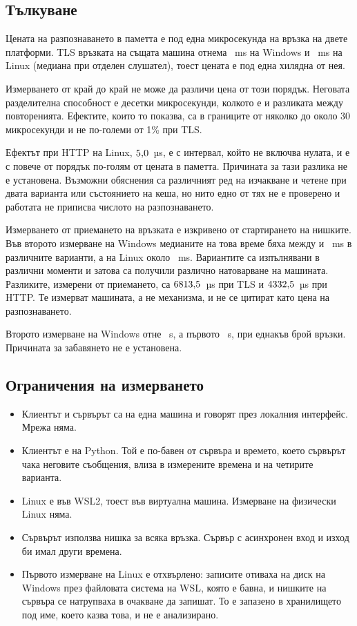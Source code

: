 \subsection{Тълкуване}

Цената на разпознаването в паметта е под една микросекунда на връзка на двете
платформи. TLS връзката на същата машина отнема \winTlsDedicatedMedian{}~ms на Windows и
\linTlsDedicatedMedian{}~ms на Linux (медиана при отделен слушател), тоест цената е под
една хилядна от нея.

Измерването от край до край не може да различи цена от този порядък. Неговата
разделителна способност е десетки микросекунди, колкото е и разликата между
повторенията. Ефектите, които то показва, са в границите от няколко до около 30
микросекунди и не по-големи от 1\% при TLS.

Ефектът при HTTP на Linux, $5{,}0$~µs, е с интервал, който не включва нулата,
и е с повече от порядък по-голям от цената в паметта. Причината за тази разлика не е
установена. Възможни обяснения са различният ред на изчакване и четене при двата
варианта или състоянието на кеша, но нито едно от тях не е проверено и работата не
приписва числото на разпознаването.

Измерването от приемането на връзката е изкривено от стартирането на нишките. Във
второто измерване на Windows медианите на това време бяха между
\winClearDedicatedStartMedian{} и \winTlsDetectStartMedian{}~ms в различните варианти, а
на Linux около \linClearDedicatedStartMedian{}~ms. Вариантите са изпълнявани в различни
моменти и затова са получили различно натоварване на машината. Разликите, измерени от
приемането, са $6813{,}5$~µs при TLS и $4332{,}5$~µs при HTTP. Те измерват
машината, а не механизма, и не се цитират като цена на разпознаването.

Второто измерване на Windows отне \winDuration{}~s, а първото \winfirstDuration{}~s, при
еднакъв брой връзки. Причината за забавянето не е установена.

\subsection{Ограничения на измерването}

\begin{itemize}
\item Клиентът и сървърът са на една машина и говорят през локалния интерфейс. Мрежа
  няма.
\item Клиентът е на Python. Той е по-бавен от сървъра и времето, което сървърът чака
  неговите съобщения, влиза в измерените времена и на четирите варианта.
\item Linux е във WSL2, тоест във виртуална машина. Измерване на физически Linux няма.
\item Сървърът използва нишка за всяка връзка. Сървър с асинхронен вход и изход би имал
  други времена.
\item Първото измерване на Linux е отхвърлено: записите отиваха на диск на Windows през
  файловата система на WSL, която е бавна, и нишките на сървъра се натрупваха в очакване
  да запишат. То е запазено в хранилището под име, което казва това, и не е анализирано.
\end{itemize}
